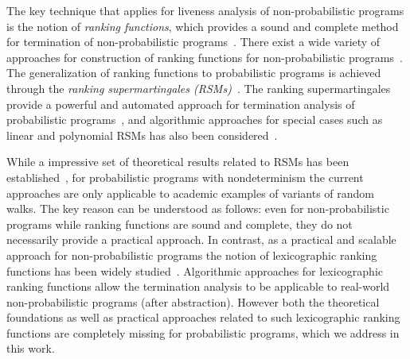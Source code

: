 \smallskip{}
The key technique that applies for liveness analysis of non-probabilistic programs is 
the notion of {\em ranking functions}, which provides a sound and complete 
method for termination of non-probabilistic programs~\cite{rwfloyd1967programs}.
There exist a wide variety of approaches for construction 
of ranking functions for non-probabilistic programs~\cite{DBLP:conf/cav/BradleyMS05,DBLP:conf/tacas/ColonS01,DBLP:conf/vmcai/PodelskiR04,DBLP:conf/pods/SohnG91}.
The generalization of ranking functions to probabilistic programs is achieved through the
{\em ranking supermartingales (RSMs)}~\cite{}.
The ranking supermartingales provide a powerful and automated approach for termination 
analysis of probabilistic programs~\cite{SRIRAM,HOLGER,HONGFEI}, and algorithmic 
approaches for special cases such as linear and polynomial RSMs has
also been considered~\cite{POPL,CAV,POPL}.



\smallskip{} 
While a impressive set of theoretical results related to RSMs has been
established~\cite{}, for probabilistic programs with nondeterminism the current approaches  
are only applicable to academic examples of variants of random walks. 
The key reason can be understood as follows: even for non-probabilistic programs while 
ranking functions are sound and complete, they do not necessarily provide a practical 
approach. 
In contrast, as a practical and scalable approach for non-probabilistic programs the 
notion of lexicographic ranking functions has been widely studied~\cite{}. 
Algorithmic approaches for lexicographic ranking functions allow the termination analysis 
to be applicable to real-world non-probabilistic programs (after abstraction).
However both the theoretical foundations as well as practical approaches related to 
such lexicographic ranking functions are completely missing for probabilistic programs,
which we address in this work.







